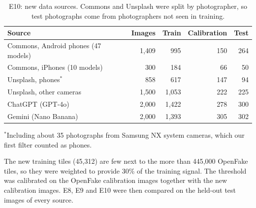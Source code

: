 \documentclass{mnnit}
\begin{document}
\begin{table}[htbp]
\centering
\caption[E10: new data sources]{E10: new data sources. Commons and Unsplash were split by photographer, so test photographs come from photographers not seen in training.}
\label{tab:e10-data}
\small
\begin{tabular}{lrrrr}
\toprule
\textbf{Source} & \textbf{Images} & \textbf{Train} & \textbf{Calibration} & \textbf{Test}\\
\midrule
Commons, Android phones (47 models) & 1{,}409 & 995 & 150 & 264\\
Commons, iPhones (10 models) & 300 & 184 & 66 & 50\\
Unsplash, phones$^{\ast}$ & 858 & 617 & 147 & 94\\
Unsplash, other cameras & 1{,}500 & 1{,}053 & 222 & 225\\
ChatGPT (GPT-4o) & 2{,}000 & 1{,}422 & 278 & 300\\
Gemini (Nano Banana) & 2{,}000 & 1{,}393 & 305 & 302\\
\bottomrule
\end{tabular}

\vspace{4pt}
{\footnotesize $^{\ast}$Including about 35 photographs from Samsung NX system cameras, which our first filter counted as phones.\par}
\end{table}

The new training tiles (45{,}312) are few next to the more than
445{,}000 OpenFake tiles, so they were weighted to provide 30\% of the training signal. The
threshold was calibrated on the OpenFake calibration images together with
the new calibration images. E8, E9 and E10 were then compared on the
held-out test images of every source.
\end{document}
